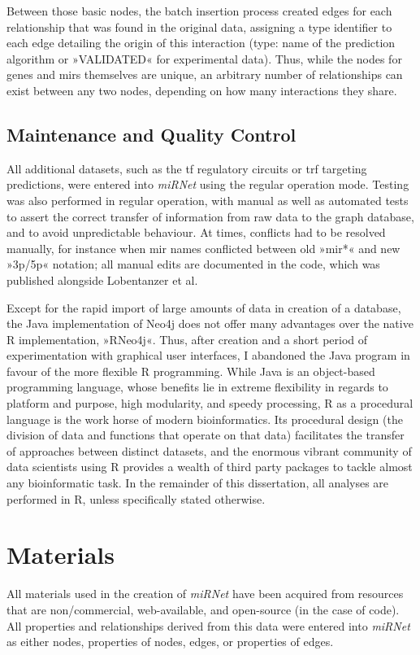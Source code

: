 Between those basic nodes, the batch insertion process created edges for each relationship that was found in the original data, assigning a type identifier to each edge detailing the origin of this interaction (type: name of the prediction algorithm or »VALIDATED« for experimental data). Thus, while the nodes for genes and \acp{mir} themselves are unique, an arbitrary number of relationships can exist between any two nodes, depending on how many interactions they share.

\subsection{Maintenance and Quality Control}
All additional datasets, such as the \ac{tf} regulatory circuits or \ac{trf} targeting predictions, were entered into \textit{miRNet} using the regular operation mode. Testing was also performed in regular operation, with manual as well as automated tests to assert the correct transfer of information from raw data to the graph database, and to avoid unpredictable behaviour. At times, conflicts had to be resolved manually, for instance when \ac{mir} names conflicted between old »\ac{mir}*« and new »3p/5p« notation; all manual edits are documented in the code, which was published alongside Lobentanzer et al\cite{Lobentanzer2019a}.

Except for the rapid import of large amounts of data in creation of a database, the Java implementation of Neo4j does not offer many advantages over the native R implementation, »RNeo4j«. Thus, after creation and a short period of experimentation with graphical user interfaces, I abandoned the Java program in favour of the more flexible R programming. While Java is an object-based programming language, whose benefits lie in extreme flexibility in regards to platform and purpose, high modularity, and speedy processing, R as a procedural language is the work horse of modern bioinformatics. Its procedural design (the division of data and functions that operate on that data) facilitates the transfer of approaches between distinct datasets, and the enormous vibrant community of data scientists using R provides a wealth of third party packages to tackle almost any bioinformatic task. In the remainder of this dissertation, all analyses are performed in R, unless specifically stated otherwise.

\section{Materials}
All materials used in the creation of \textit{miRNet} have been acquired from resources that are non\-/commercial, web-available, and open-source (in the case of code). All properties and relationships derived from this data were entered into \textit{miRNet} as either nodes, properties of nodes, edges, or properties of edges. 

